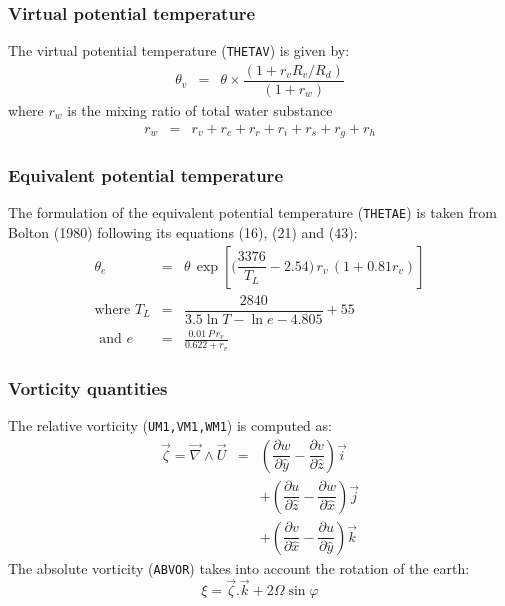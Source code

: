\subsubsection{Virtual potential temperature}
The virtual potential temperature ({\tt THETAV}) is given by:
\begin{eqnarray}
\theta_v &=& \theta \times \dfrac{(1 + r_v R_v /R_d)}
                            {(1+r_w)}
\end{eqnarray}
where $r_w$ is the mixing ratio of total water substance
\begin{eqnarray}
r_w &=& r_v+r_c+r_r+r_i+r_s+r_g+r_h   \nonumber
\end{eqnarray}


\subsubsection{Equivalent potential temperature}
The formulation of the equivalent potential temperature ({\tt THETAE})
is taken from Bolton (1980) following its equations (16), (21) and (43):
\begin{eqnarray}
\theta_e &=& \theta \, \exp \left[\Big(\dfrac{3376}{T_L} - 2.54\Big) 
                    \, r_v \, (1 + 0.81 r_v) \right ] \\
\mbox{where } T_L &=& \dfrac{2840}{3.5 \ln T - \ln e - 4.805} +55 \nonumber \\
\mbox{ and } e   &=& \frac{0.01\, P \, r_v}{0.622 +r_v} \nonumber
\end{eqnarray}


\subsubsection{Vorticity quantities}
The relative vorticity ({\tt UM1,VM1,WM1}) is computed as:
\begin{eqnarray}
\vec\zeta= \vec{\nabla}\wedge\vec{U} &= &
(\dfrac{\partial w}{\partial\hat{y}} - \dfrac{\partial v}{\partial\hat{z}})\vec{i}
\nonumber \\
& &+ (\dfrac{\partial u}{\partial\hat{z}} - \dfrac{\partial w}{\partial\hat{x}})\vec{j}
\nonumber \\
& &+ (\dfrac{\partial v}{\partial\hat{x}} - \dfrac{\partial u}{\partial\hat{y}})\vec{k}
\end{eqnarray}
The absolute vorticity ({\tt ABVOR}) 
takes into account the rotation of the earth:
\begin{equation}
\xi= \vec{\zeta}.\vec{k} + 2 \Omega\sin\varphi
\end{equation}


